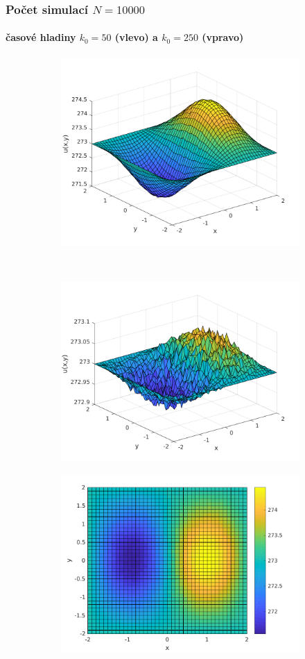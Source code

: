\begin{frame}\frametitle{Počet simulací $N=10000$}
\framesubtitle{časové hladiny $k_{0}=50$ (vlevo) a $k_{0}=250$ (vpravo)}
\begin{figure}
    \centering
    \begin{subfigure}[t]{0.5\textwidth}
        \centering
        \includegraphics[width=0.75\linewidth]{../../results/simulations/10000/solution_3D/solution_3D_sim10000_step01_time50_boundary2.pdf}
    \end{subfigure}%
    ~ 
    \begin{subfigure}[t]{0.5\textwidth}
        \centering
        \includegraphics[width=0.75\linewidth]{../../results/simulations/10000/solution_3D/solution_3D_sim10000_step01_time250_boundary2.pdf}
    \end{subfigure}
    \begin{subfigure}[t]{0.5\textwidth}
        \centering
        \includegraphics[width=0.725\linewidth]{../../results/simulations/10000/solution_2D/solution_2D_sim10000_step01_time50_boundary2.pdf}

\end{subfigure}
\end{figure}
\end{frame}
